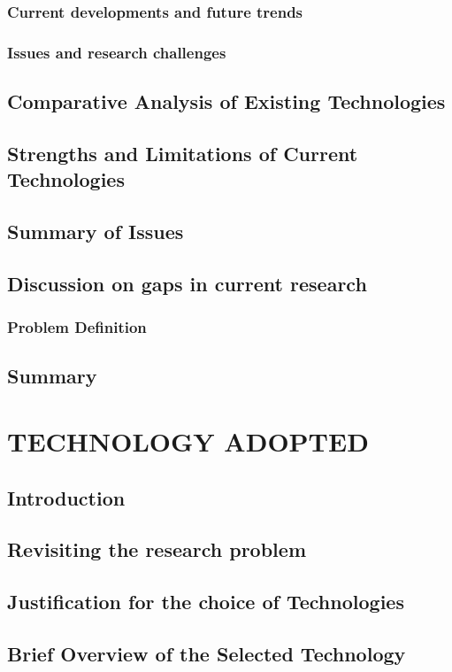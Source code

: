 \documentclass[12pt, a4paper]{report}
\begin{document}
\subsection{Current developments and future trends}
\subsection{Issues and research challenges}
\section{Comparative Analysis of Existing Technologies}
\section{Strengths and Limitations of Current Technologies}
\section{Summary of Issues}
\section{Discussion on gaps in current research}
\subsection{Problem Definition}
\section{Summary}

\chapter{TECHNOLOGY ADOPTED}
\section{Introduction}
\section{Revisiting the research problem}
\section{Justification for the choice of Technologies}
\section{Brief Overview of the Selected Technology}
\end{document}
